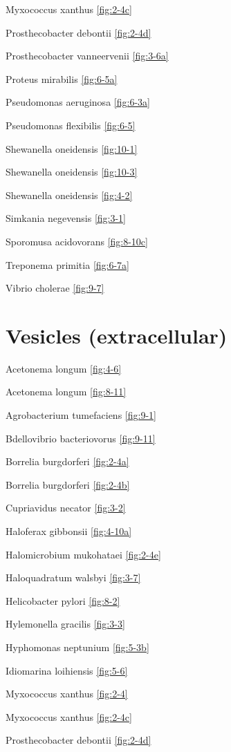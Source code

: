 \documentclass[]{tufte-book}
\begin{document}
Myxococcus xanthus \ref{fig:2-4c}

Prosthecobacter debontii \ref{fig:2-4d}

Prosthecobacter vanneervenii \ref{fig:3-6a}

Proteus mirabilis \ref{fig:6-5a}

Pseudomonas aeruginosa \ref{fig:6-3a}

Pseudomonas flexibilis \ref{fig:6-5}

Shewanella oneidensis \ref{fig:10-1}

Shewanella oneidensis \ref{fig:10-3}

Shewanella oneidensis \ref{fig:4-2}

Simkania negevensis \ref{fig:3-1}

Sporomusa acidovorans \ref{fig:8-10c}

Treponema primitia \ref{fig:6-7a}

Vibrio cholerae \ref{fig:9-7}

\hypertarget{vesicles-extracellular}{%
\section*{Vesicles (extracellular)}\label{vesicles-extracellular}}

Acetonema longum \ref{fig:4-6}

Acetonema longum \ref{fig:8-11}

Agrobacterium tumefaciens \ref{fig:9-1}

Bdellovibrio bacteriovorus \ref{fig:9-11}

Borrelia burgdorferi \ref{fig:2-4a}

Borrelia burgdorferi \ref{fig:2-4b}

Cupriavidus necator \ref{fig:3-2}

Haloferax gibbonsii \ref{fig:4-10a}

Halomicrobium mukohataei \ref{fig:2-4e}

Haloquadratum walsbyi \ref{fig:3-7}

Helicobacter pylori \ref{fig:8-2}

Hylemonella gracilis \ref{fig:3-3}

Hyphomonas neptunium \ref{fig:5-3b}

Idiomarina loihiensis \ref{fig:5-6}

Myxococcus xanthus \ref{fig:2-4}

Myxococcus xanthus \ref{fig:2-4c}

Prosthecobacter debontii \ref{fig:2-4d}
\end{document}

